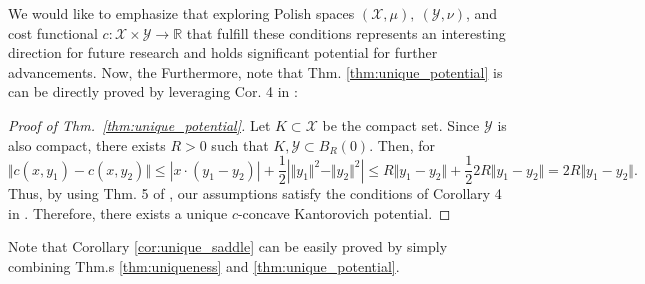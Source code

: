 We would like to emphasize that exploring Polish spaces $(\mathcal{X}, \mu), \ (\mathcal{Y}, \nu)$, and cost functional $c:\mathcal{X}\times\mathcal{Y}\rightarrow \mathbb{R}$ that fulfill these conditions represents an interesting direction for future research and holds significant potential for further advancements.
Now, the 
Furthermore, note that Thm. \ref{thm:unique_potential} is can be directly proved by leveraging Cor. 4 in \citet{staudt2022c}:
\begin{proof}[Proof of Thm.~\ref{thm:unique_potential}]
    Let $K \subset \mathcal{X}$ be the compact set. Since $\mathcal{Y}$ is also compact, there exists $R>0$ such that $K, \mathcal{Y} \subset B_R (0)$. Then, for 
    \begin{equation}
         \Vert c(x, y_1) - c(x, y_2) \Vert \leq | x \cdot (y_1 - y_2) | + \frac{1}{2} | \Vert y_1\Vert^2 - \Vert y_2\Vert^2 | \leq R \Vert y_1 - y_2 \Vert + \frac{1}{2} 2R \Vert y_1 - y_2 \Vert = 2R \Vert y_1 - y_2 \Vert.
    \end{equation}
    Thus, by using Thm. 5 of \citet{staudt2022c}, our assumptions satisfy the conditions of Corollary 4 in \citet{staudt2022c}.
    Therefore, there exists a unique $c$-concave Kantorovich potential.
\end{proof}

Note that Corollary \ref{cor:unique_saddle} can be easily proved by simply combining
Thm.s \ref{thm:uniqueness} and \ref{thm:unique_potential}.


    


